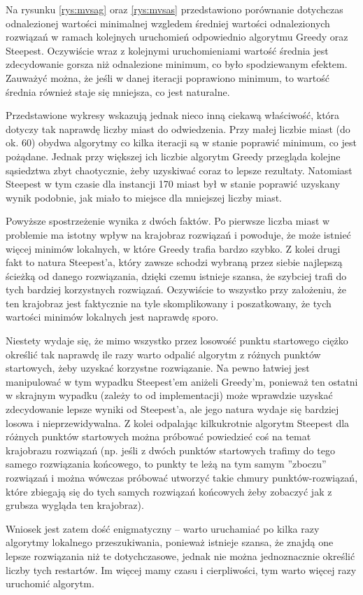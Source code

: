 Na rysunku \ref{rys:mvsag} oraz \ref{rys:mvsas} przedstawiono porównanie dotychczas odnalezionej wartości minimalnej wzgledem średniej wartości odnalezionych rozwiązań w ramach kolejnych uruchomień odpowiednio algorytmu Greedy oraz Steepest. Oczywiście wraz z kolejnymi uruchomieniami wartość średnia jest zdecydowanie gorsza niż odnalezione minimum, co było spodziewanym efektem. Zauważyć można, że jeśli w danej iteracji poprawiono minimum, to wartość średnia również staje się mniejsza, co jest naturalne.

Przedstawione wykresy wskazują jednak nieco inną ciekawą właściwość, która dotyczy tak naprawdę liczby miast do odwiedzenia. Przy małej liczbie miast (do ok. 60) obydwa algorytmy co kilka iteracji są w stanie poprawić minimum, co jest pożądane. Jednak przy większej ich liczbie algorytm Greedy przegląda kolejne sąsiedztwa zbyt chaotycznie, żeby uzyskiwać coraz to lepsze rezultaty. Natomiast Steepest w tym czasie dla instancji 170 miast był w stanie poprawić uzyskany wynik podobnie, jak miało to miejsce dla mniejszej liczby miast.

Powyższe spostrzeżenie wynika z dwóch faktów. Po pierwsze liczba miast w problemie ma istotny wpływ na krajobraz rozwiązań i powoduje, że może istnieć więcej minimów lokalnych, w które Greedy trafia bardzo szybko. Z kolei drugi fakt to natura Steepest'a, który zawsze schodzi wybraną przez siebie najlepszą ścieżką od danego rozwiązania, dzięki czemu istnieje szansa, że szybciej trafi do tych bardziej korzystnych rozwiązań. Oczywiście to wszystko przy założeniu, że ten krajobraz jest faktycznie na tyle skomplikowany i poszatkowany, że tych wartości minimów lokalnych jest naprawdę sporo.

Niestety wydaje się, że mimo wszystko przez losowość punktu startowego ciężko określić tak naprawdę ile razy warto odpalić algorytm z różnych punktów startowych, żeby uzyskać korzystne rozwiązanie. Na pewno łatwiej jest manipulować w tym wypadku Steepest'em aniżeli Greedy'm, ponieważ ten ostatni w skrajnym wypadku (zależy to od implementacji) może wprawdzie uzyskać zdecydowanie lepsze wyniki od Steepest'a, ale jego natura wydaje się bardziej losowa i nieprzewidywalna. Z kolei odpalając kilkukrotnie algorytm Steepest dla różnych punktów startowych można próbować powiedzieć coś na temat krajobrazu rozwiązań (np. jeśli z dwóch punktów startowych trafimy do tego samego rozwiązania końcowego, to punkty te leżą na tym samym ''zboczu'' rozwiązań i można wówczas próbować utworzyć takie chmury punktów-rozwiązań, które zbiegają się do tych samych rozwiązań końcowych żeby zobaczyć jak z grubsza wygląda ten krajobraz).

Wniosek jest zatem dość enigmatyczny -- warto uruchamiać po kilka razy algorytmy lokalnego przeszukiwania, ponieważ istnieje szansa, że znajdą one lepsze rozwiązania niż te dotychczasowe, jednak nie można jednoznacznie określić liczby tych restartów. Im więcej mamy czasu i cierpliwości, tym warto więcej razy uruchomić algorytm.